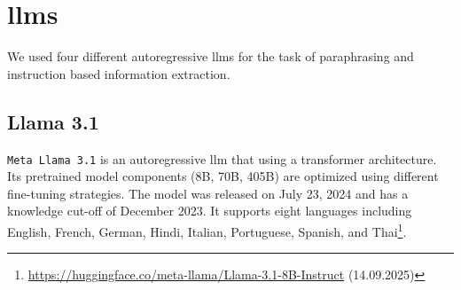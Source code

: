 \chapter{\Aclp{llm}}
\label{app:language_models}

We used four different autoregressive \acp{llm} for the task of paraphrasing and instruction based information extraction.

\begin{table}[h]
\centering
\caption{Collection of multilingual \acp{llm} used for paraphrasing\protect\footnotemark.}

\label{tab:llm_paraphrasers}
\end{table}

\section{Llama 3.1}

\texttt{Meta Llama 3.1} is an autoregressive \ac{llm} that using a transformer architecture.
Its pretrained model components  (8B, 70B, 405B) are optimized using different fine-tuning strategies.
The model was released on July 23, 2024 and has a knowledge cut-off of December 2023.
It supports eight languages including English, French, German, Hindi, Italian, Portuguese, Spanish, and Thai\footnote{\url{https://huggingface.co/meta-llama/Llama-3.1-8B-Instruct} (14.09.2025)}.

